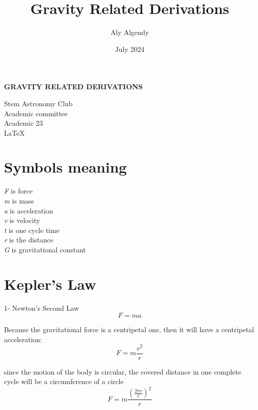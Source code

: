 \documentclass{article}
\title{Gravity Related Derivations}
\author{Aly Algendy}
\date{July 2024}
\begin{document}
\thispagestyle{empty}

\begin{center}
    \LARGE \textbf{GRAVITY RELATED DERIVATIONS}\\
\end{center}

\begin{center}
    {\Large Stem Astronomy Club\\} 
    Academic committee\\
    Academic 23\\
    \LaTeX{} 
\end{center}
    
\vspace{55mm}

\tableofcontents

\newpage
\setcounter{page}{1}

\section{Symbols meaning}
\textit{F} is force\\
\textit{m} is mass\\
\textit{a} is acceleration\\
\textit{v} is velocity\\
\textit{t} is one cycle time\\
\textit{r} is the distance\\
\textit{G} is gravitational constant\\

\section{Kepler’s Law}

1- Newton’s Second Law
\begin{equation}
    F=ma
\end{equation}

\noindent Because the gravitational force is a centripetal one, then it will have a centripetal acceleration:
\begin{equation}
    F=m\frac{v^2}{r}
\end{equation}

\noindent since the motion of the body is circular, the covered distance in one complete cycle will be a circumference of a circle
\begin{equation}
    F=m\frac{\left(\frac{2\pi r}{t}\right)^2}{r}  
\end{equation} 
\end{document}
